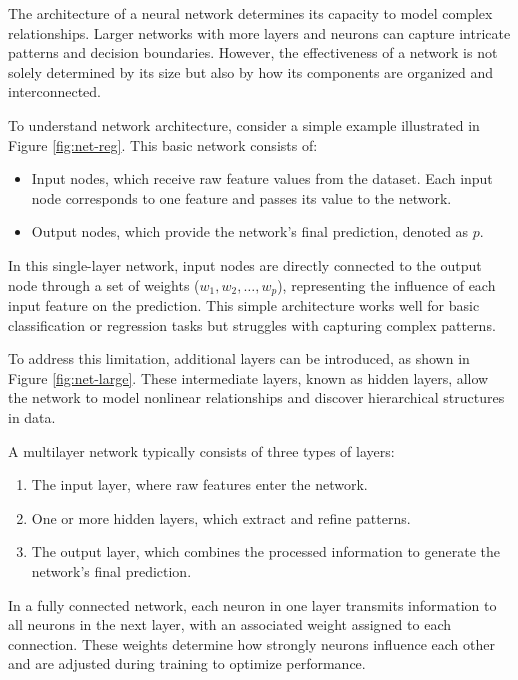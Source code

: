 \documentclass[
  11pt,
]{book}
\providecommand{\tightlist}{%
  \setlength{\itemsep}{0pt}\setlength{\parskip}{0pt}}
\theoremstyle{definition}
\theoremstyle{definition}
\theoremstyle{definition}
\theoremstyle{definition}
\theoremstyle{remark}
\begin{document}
The architecture of a neural network determines its capacity to model complex relationships. Larger networks with more layers and neurons can capture intricate patterns and decision boundaries. However, the effectiveness of a network is not solely determined by its size but also by how its components are organized and interconnected.

To understand network architecture, consider a simple example illustrated in Figure \ref{fig:net-reg}. This basic network consists of:

\begin{itemize}
\tightlist
\item
  Input nodes, which receive raw feature values from the dataset. Each input node corresponds to one feature and passes its value to the network.\\
\item
  Output nodes, which provide the network's final prediction, denoted as \(p\).
\end{itemize}

In this single-layer network, input nodes are directly connected to the output node through a set of weights (\(w_1, w_2, \dots, w_p\)), representing the influence of each input feature on the prediction. This simple architecture works well for basic classification or regression tasks but struggles with capturing complex patterns.

To address this limitation, additional layers can be introduced, as shown in Figure \ref{fig:net-large}. These intermediate layers, known as hidden layers, allow the network to model nonlinear relationships and discover hierarchical structures in data.

A multilayer network typically consists of three types of layers:

\begin{enumerate}
\def\labelenumi{\arabic{enumi}.}
\tightlist
\item
  The input layer, where raw features enter the network.\\
\item
  One or more hidden layers, which extract and refine patterns.\\
\item
  The output layer, which combines the processed information to generate the network's final prediction.
\end{enumerate}

In a fully connected network, each neuron in one layer transmits information to all neurons in the next layer, with an associated weight assigned to each connection. These weights determine how strongly neurons influence each other and are adjusted during training to optimize performance.
\end{document}
